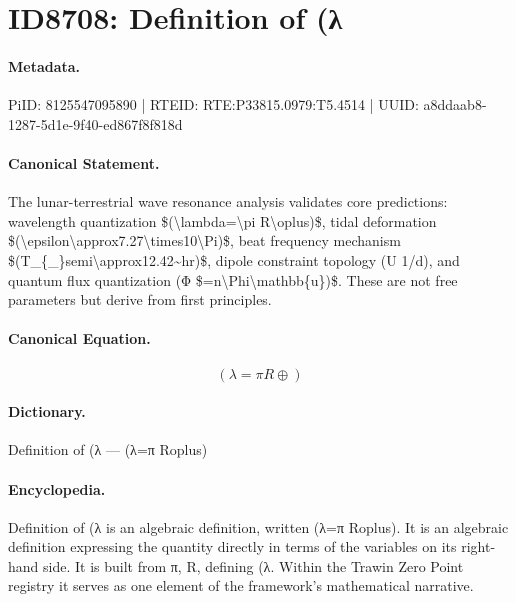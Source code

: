 \section*{ID8708: Definition of (λ}
\paragraph{Metadata.}
PiID: 8125547095890 | RTEID: RTE:P33815.0979:T5.4514 | UUID: a8ddaab8-1287-5d1e-9f40-ed867f8f818d

\paragraph{Canonical Statement.}
The lunar-terrestrial wave resonance analysis validates core predictions: wavelength quantization \$(\textbackslash{}lambda=\textbackslash{}pi R\textbackslash{}oplus)\$, tidal deformation \$(\textbackslash{}epsilon\textbackslash{}approx7.27\textbackslash{}times10\textbackslash{}Pi)\$, beat frequency mechanism \$(T\_\{\_\}semi\textbackslash{}approx12.42\textasciitilde{}hr)\$, dipole constraint topology (U 1/d), and quantum flux quantization (Φ \$=n\textbackslash{}Phi\textbackslash{}mathbb\{u\})\$. These are not free parameters but derive from first principles.

\paragraph{Canonical Equation.}
\[
(\lambda=\pi R\oplus)
\]

\paragraph{Dictionary.}
Definition of (λ — (λ=π Roplus)

\paragraph{Encyclopedia.}
Definition of (λ is an algebraic definition, written (λ=π Roplus). It is an algebraic definition expressing the quantity directly in terms of the variables on its right-hand side. It is built from π, R, defining (λ. Within the Trawin Zero Point registry it serves as one element of the framework's mathematical narrative.
